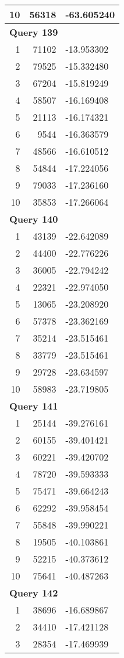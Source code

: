 \begin{longtable}[{p}]{@{}rrp{}@{}}
10 & 56318 & -63.605240 \\
\midrule
\multicolumn{3}{l}{\bfseries Query 139} \\
1 & 71102 & -13.953302 \\
2 & 79525 & -15.332480 \\
3 & 67204 & -15.819249 \\
4 & 58507 & -16.169408 \\
5 & 21113 & -16.174321 \\
6 & 9544 & -16.363579 \\
7 & 48566 & -16.610512 \\
8 & 54844 & -17.224056 \\
9 & 79033 & -17.236160 \\
10 & 35853 & -17.266064 \\
\midrule
\multicolumn{3}{l}{\bfseries Query 140} \\
1 & 43139 & -22.642089 \\
2 & 44400 & -22.776226 \\
3 & 36005 & -22.794242 \\
4 & 22321 & -22.974050 \\
5 & 13065 & -23.208920 \\
6 & 57378 & -23.362169 \\
7 & 35214 & -23.515461 \\
8 & 33779 & -23.515461 \\
9 & 29728 & -23.634597 \\
10 & 58983 & -23.719805 \\
\midrule
\multicolumn{3}{l}{\bfseries Query 141} \\
1 & 25144 & -39.276161 \\
2 & 60155 & -39.401421 \\
3 & 60221 & -39.420702 \\
4 & 78720 & -39.593333 \\
5 & 75471 & -39.664243 \\
6 & 62292 & -39.958454 \\
7 & 55848 & -39.990221 \\
8 & 19505 & -40.103861 \\
9 & 52215 & -40.373612 \\
10 & 75641 & -40.487263 \\
\midrule
\multicolumn{3}{l}{\bfseries Query 142} \\
1 & 38696 & -16.689867 \\
2 & 34410 & -17.421128 \\
3 & 28354 & -17.469939 \\

\end{longtable}
